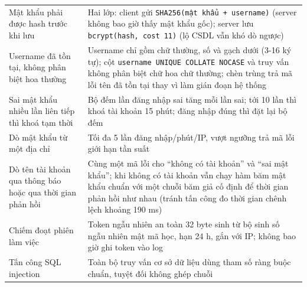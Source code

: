 \begin{center}\small
\begin{tabularx}{\linewidth}{|L{4.3cm}|Y|}
\hline
{} &  \\ \hline
Mật khẩu phải được hash trước khi lưu & Hai lớp: client gửi \texttt{SHA256(mật khẩu + username)} (server không bao giờ thấy mật khẩu gốc); server lưu \texttt{bcrypt(hash, cost 11)} (lộ CSDL vẫn khó dò ngược) \\ \hline
Username đã tồn tại, không phân biệt hoa thường & Username chỉ gồm chữ thường, số và gạch dưới (3-16 ký tự); cột \texttt{username UNIQUE COLLATE NOCASE} và truy vấn không phân biệt chữ hoa chữ thường; chèn trùng trả mã lỗi tên đã tồn tại thay vì làm gián đoạn hệ thống \\ \hline
Sai mật khẩu nhiều lần liên tiếp thì khoá tạm thời & Bộ đếm lần đăng nhập sai tăng mỗi lần sai; tới 10 lần thì khoá tài khoản 15 phút; đăng nhập đúng thì đặt lại bộ đếm \\ \hline
Dò mật khẩu từ một địa chỉ & Tối đa 5 lần đăng nhập/phút/IP, vượt ngưỡng trả mã lỗi giới hạn tần suất \\ \hline
Dò tên tài khoản qua thông báo hoặc qua thời gian phản hồi & Cùng một mã lỗi cho ``không có tài khoản'' và ``sai mật khẩu''; khi không có tài khoản vẫn chạy hàm băm mật khẩu chuẩn với một chuỗi băm giả cố định để thời gian phản hồi như nhau (tránh tấn công đo thời gian chênh lệch khoảng 190 ms) \\ \hline
Chiếm đoạt phiên làm việc & Token ngẫu nhiên an toàn 32 byte sinh từ bộ sinh số ngẫu nhiên mật mã học, hạn 24 h, gắn với IP; không bao giờ ghi token vào log \\ \hline
Tấn công SQL injection & Toàn bộ truy vấn cơ sở dữ liệu dùng tham số ràng buộc chuẩn, tuyệt đối không ghép chuỗi \\ \hline
\end{tabularx}
\end{center}

